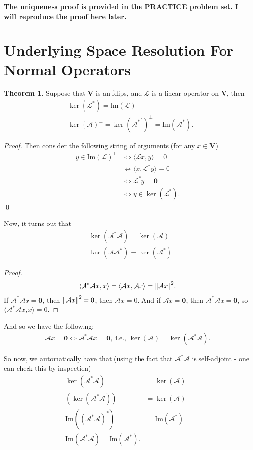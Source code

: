 \documentclass{book}
\theoremstyle{definition}
\newtheorem{thm}{Theorem}[section]
\newcommand{\V}{\mathbf{V}}
\newcommand{\A}{\mathcal{A}}
\newcommand{\lag}{\mathcal{L}}
\newcommand{\ima}{\text{Im}}
\newcommand{\la}{\langle}
\newcommand{\ra}{\rangle}
\begin{document}
\textbf{The uniqueness proof is provided in the PRACTICE problem set. I will reproduce the proof here later. }


\section{Underlying Space Resolution For Normal Operators}

\begin{thm}
	Suppose that $\V$ is an fdips, and $\lag$ is a linear operator on $\V$, then 
	\begin{align*}
	&\ker(\lag^*) = \ima(\lag)^\perp\\
	&\ker(\A)^\perp = \ker({\A^*}^*)^\perp = \ima(\A^*).
	\end{align*}
\end{thm}


\begin{proof}
	Then consider the following string of arguments (for any $x\in \V$)
	\begin{align*}
	y \in \ima(\lag)^\perp &\iff \la \lag x,y \ra = 0\\
	&\iff \la x, \lag^*y \ra = 0\\
	&\iff \lag^* y = \mathbf{0}\\
	&\iff y\in \ker(\lag^*).
	\end{align*}\qed
\end{proof}



Now, it turns out that 
\begin{align*}
&\ker(\A^*\A) = \ker(\A)\\
&\ker(\A\A^*) = \ker(\A^*)
\end{align*}

\begin{proof}
	\begin{align*}
	\la \A^*\A x,x \ra = \la \A x,\A x \ra = \norm{\A x}^2.
	\end{align*}
	If $\A^*\A x = \mathbf{0}$, then $\norm{\A x}^2 = 0$, then $\A x = 0$. And if $\A x = \mathbf{0}$, then $\A^*\A x = \mathbf{0}$, so $\la \A^*\A x,x\ra = 0$. 
\end{proof}

And so we have the following:
\begin{align*}
\A x = \mathbf{0} \iff \A^*\A x = \mathbf{0}, \text{ i.e., } \ker(\A) = \ker(\A^*\A).
\end{align*}

So now, we automatically have that (using the fact that $\A^*\A$ is self-adjoint - one can check this by inspection)
\begin{align*}
\ker(\A^*\A) &= \ker(\A)\\
(\ker(\A^*\A))^\perp &= \ker(\A)^\perp\\
\ima({(\A^*\A)}^*) &= \ima(\A^*)\\
\ima(\A^*\A) = \ima(\A^*).
\end{align*}
\end{document}
